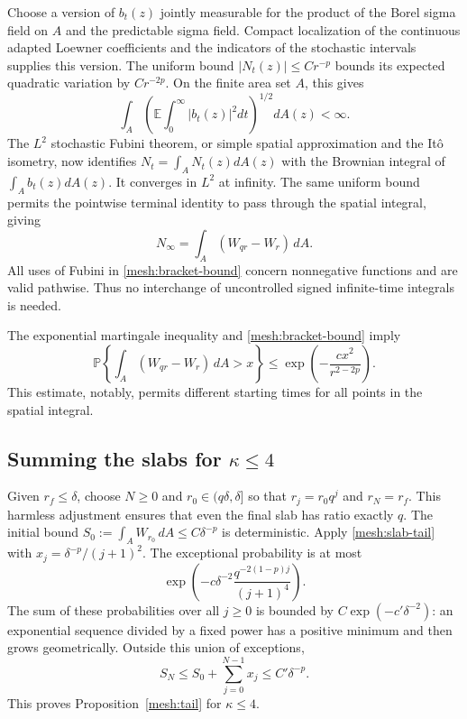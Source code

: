 \documentclass[11pt]{article}
\theoremstyle{definition}
\theoremstyle{remark}
\numberwithin{equation}{section}
\begin{document}
Choose a version of $b_t(z)$ jointly measurable for the product of
the Borel sigma field on $A$ and the predictable sigma field.
Compact localization of the continuous adapted Loewner coefficients
and the indicators of the stochastic intervals supplies this version.  The
uniform bound $|N_t(z)|\le Cr^{-p}$ bounds its expected quadratic
variation by $Cr^{-2p}$.  On the finite area set $A$, this gives
\[
 \int_A\left(\mathbb E\int_0^\infty |b_t(z)|^2dt\right)^{1/2}
 dA(z)<\infty.
\]
The $L^2$ stochastic Fubini theorem, or simple spatial approximation
and the It\^o isometry, now identifies
$N_t=\int_A N_t(z)dA(z)$ with the Brownian integral of
$\int_A b_t(z)dA(z)$.  It converges in $L^2$ at infinity.  The same
uniform bound permits the pointwise terminal identity to pass through
the spatial integral, giving
\[
 N_\infty=\int_A(W_{qr}-W_r)\,dA.
\]
All uses of Fubini in \eqref{mesh:bracket-bound} concern nonnegative
functions and are valid pathwise.  Thus no interchange of
uncontrolled signed infinite-time integrals is needed.

The exponential martingale inequality and
\eqref{mesh:bracket-bound} imply
\begin{equation}
 \mathbb P\left\{\int_A(W_{qr}-W_r)\,dA>x\right\}
 \le\exp\left(-\frac{c x^2}{r^{2-2p}}\right).
 \label{mesh:slab-tail}
\end{equation}
This estimate, notably, permits different starting times for all
points in the spatial integral.

\subsection{Summing the slabs for
\texorpdfstring{$\kappa\le4$}{kappa at most four}}

Given $r_f\le\delta$, choose $N\ge0$ and
$r_0\in(q\delta,\delta]$ so that $r_j=r_0q^j$ and $r_N=r_f$.
This harmless adjustment ensures that even the final slab has ratio
exactly $q$.  The initial bound
$S_0:=\int_AW_{r_0}\,dA\le C\delta^{-p}$ is deterministic.
Apply \eqref{mesh:slab-tail} with
$x_j=\delta^{-p}/(j+1)^2$.  The exceptional probability is at most
\[
 \exp\left(-c\delta^{-2}
       \frac{q^{-2(1-p)j}}{(j+1)^4}\right).
\]
The sum of these probabilities over all $j\ge0$ is bounded by
$C\exp(-c'\delta^{-2})$: an exponential sequence divided by a fixed
power has a positive minimum and then grows geometrically.  Outside
this union of exceptions,
\[
 S_N\le S_0+\sum_{j=0}^{N-1}x_j\le C'\delta^{-p}.
\]
This proves Proposition~\ref{mesh:tail} for $\kappa\le4$.
\end{document}
